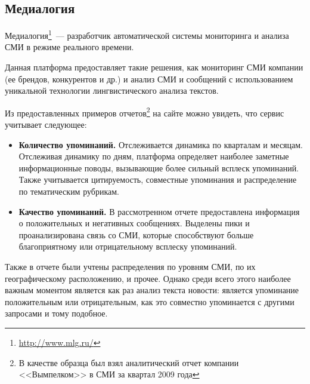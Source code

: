 \subsection{Медиалогия}

Медиалогия\footnote{\url{http://www.mlg.ru/}}~--- разработчик автоматической системы мониторинга и анализа СМИ в режиме реального времени.

Данная платформа предоставляет такие решения, как мониторинг СМИ компании (ее брендов, конкурентов и др.) и анализ СМИ и сообщений с использованием уникальной технологии лингвистического анализа текстов.

Из предоставленных примеров отчетов\footnote{В качестве образца был взял аналитический отчет компании <<Вымпелком>> в СМИ за  квартал 2009 года} на сайте можно увидеть, что сервис учитывает следующее:

\begin{itemize}

\item \textbf{Количество упоминаний.} Отслеживается динамика по кварталам и месяцам. Отслеживая динамику по дням, платформа определяет наиболее заметные информационные поводы, вызывающие более сильный всплеск упоминаний. Также учитывается цитируемость, совместные упоминания и распределение по тематическим рубрикам.

\item \textbf{Качество упоминаний.} В рассмотренном отчете предоставлена информация о положительных и негативных сообщениях. Выделены пики и проанализирована связь со СМИ, которые способствуют больше благоприятному или отрицательному всплеску упоминаний.

\end{itemize}

Также в отчете были учтены распределения по уровням СМИ, по их географическому расположению, и прочее. Однако среди всего этого наиболее важным моментом является как раз анализ текста новости: является упоминание положительным или отрицательным, как это совместно упоминается с другими запросами и тому подобное.